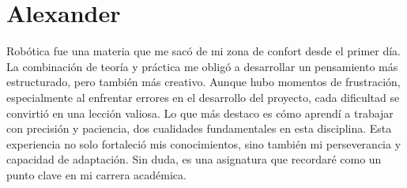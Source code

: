 \section{Alexander}
Robótica fue una materia que me sacó de mi zona de confort desde el primer día. La combinación de teoría y práctica me obligó a desarrollar un pensamiento más estructurado, pero también más creativo. Aunque hubo momentos de frustración, especialmente al enfrentar errores en el desarrollo del proyecto, cada dificultad se convirtió en una lección valiosa. Lo que más destaco es cómo aprendí a trabajar con precisión y paciencia, dos cualidades fundamentales en esta disciplina. Esta experiencia no solo fortaleció mis conocimientos, sino también mi perseverancia y capacidad de adaptación. Sin duda, es una asignatura que recordaré como un punto clave en mi carrera académica.